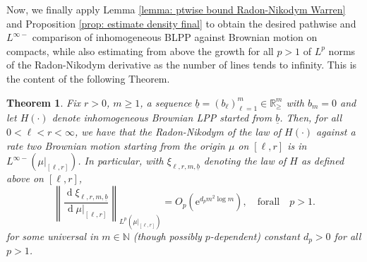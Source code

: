 \documentclass[11pt, reqno]{amsart}
\numberwithin{equation}{section}
\newcounter{dummy} \numberwithin{dummy}{section}
\newtheorem{theorem}[dummy]{Theorem}
\newcommand{\N}{\ensuremath{\mathbb{N}}}
\newcommand{\R}{\ensuremath{\mathbb{R}}}
\newcommand{\norm}[1]{\left\lVert#1\right\rVert}
\newcommand{\diff}{\ensuremath{\operatorname{d}\!}}
\begin{document}
Now, we finally apply Lemma \ref{lemma: ptwise bound Radon-Nikodym  Warren} and Proposition \ref{prop: estimate density final} to obtain the desired pathwise and $L^{\infty-}$ comparison of inhomogeneous BLPP against Brownian motion on compacts, while also estimating from above the growth for all $p>1$ of $L^p$ norms of the Radon-Nikodym derivative as the number of lines tends to infinity. This is the content of the following Theorem.
\begin{theorem}\label{thm: tasep bm abs cont}
Fix $r>0$, $m\ge 1$, a sequence $\underline{b}=(b_\ell)_{\ell =1}^m \in\R^m_{\ge}$ with $b_m = 0$ and let $H(\cdot)$ denote inhomogeneous Brownian LPP started from $\underline{b}$. Then, for all $0<\ell<r<\infty$, we have that the Radon-Nikodym of the law of $H(\cdot)$ against a rate two Brownian motion starting from the origin $\mu$ on $[\ell,r]$ is in $L^{\infty-}(\mu\vert_{[\ell, r]})$. In particular, with $\xi_{\ell, r, m, \underline{b}}$ denoting the law of $H$ as defined above on $[\ell, r]$,
     \begin{equation*}
         \norm{\frac{\diff \xi_{\ell, r, m, \underline{b}}}{\diff\mu\vert_{[\ell, r]}}}_{L^p(\mu\vert_{[\ell, r]})} =  O_p(\mathrm{e}^{d_pm^2\log m}),\quad \mathrm{for all}\quad p>1.
     \end{equation*}
     for some universal in $m\in \N$ (though possibly $p$-dependent) constant $d_p>0$ for all $p>1$.
\end{theorem}
\end{document}
